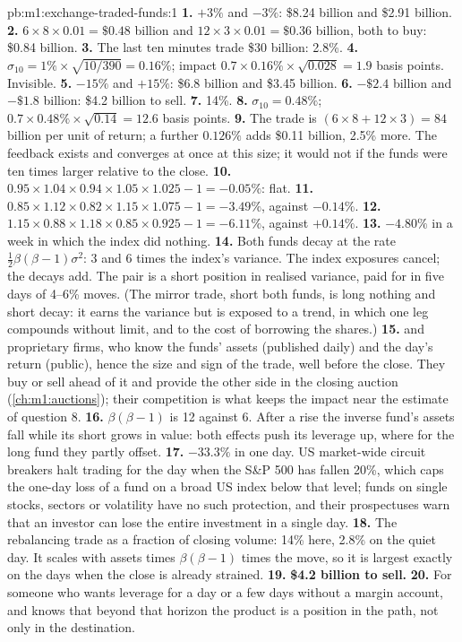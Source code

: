 \begin{solution}{pb:m1:exchange-traded-funds:1}
\textbf{1.} $+3\%$ and $-3\%$: \$8.24 billion and \$2.91 billion.
\textbf{2.} $6 \times 8 \times 0.01 = \$0.48$ billion and $12 \times 3 \times
0.01 = \$0.36$ billion, both to buy: \$0.84 billion.
\textbf{3.} The last ten minutes trade \$30 billion: 2.8\%.
\textbf{4.} $\sigma_{10} = 1\% \times \sqrt{10/390} = 0.16\%$; impact $0.7
\times 0.16\% \times \sqrt{0.028} = 1.9$ basis points. Invisible.
\textbf{5.} $-15\%$ and $+15\%$: \$6.8 billion and \$3.45 billion.
\textbf{6.} $-\$2.4$ billion and $-\$1.8$ billion: \$4.2 billion to sell.
\textbf{7.} 14\%.
\textbf{8.} $\sigma_{10} = 0.48\%$; $0.7 \times 0.48\% \times \sqrt{0.14} =
12.6$ basis points.
\textbf{9.} The trade is $(6 \times 8 + 12 \times 3) = 84$ billion per unit of
return; a further $0.126\%$ adds \$0.11 billion, 2.5\% more. The feedback
exists and converges at once at this size; it would not if the funds were ten
times larger relative to the close.
\textbf{10.} $0.95 \times 1.04 \times 0.94 \times 1.05 \times 1.025 - 1 =
-0.05\%$: flat.
\textbf{11.} $0.85 \times 1.12 \times 0.82 \times 1.15 \times 1.075 - 1 =
-3.49\%$, against $-0.14\%$.
\textbf{12.} $1.15 \times 0.88 \times 1.18 \times 0.85 \times 0.925 - 1 =
-6.11\%$, against $+0.14\%$.
\textbf{13.} $-4.80\%$ in a week in which the index did nothing.
\textbf{14.} Both funds decay at the rate $\tfrac12\beta(\beta-1)\sigma^2$: 3
and 6 times the index's variance. The index exposures cancel; the decays add.
The pair is a short position in realised variance, paid for in five days of
4--6\% moves. (The mirror trade, short both funds, is long nothing and short
decay: it earns the variance but is exposed to a trend, in which one leg
compounds without limit, and to the cost of borrowing the shares.)
\textbf{15.}  and proprietary firms, who know the funds' assets
(published daily) and the day's return (public), hence the size and sign of
the trade, well before the close. They buy or sell ahead of it and provide
the other side in the closing auction (\cref{ch:m1:auctions}); their
competition is what keeps the impact near the estimate of question 8.
\textbf{16.} $\beta(\beta-1)$ is 12 against 6. After a rise the inverse
fund's assets fall while its short grows in value: both effects push its
leverage up, where for the long fund they partly offset.
\textbf{17.} $-33.3\%$ in one day. US market-wide circuit breakers halt
trading for the day when the S\&P 500 has fallen 20\%, which caps the one-day
loss of a fund on a broad US index below that level; funds on single stocks,
sectors or volatility have no such protection, and their prospectuses warn
that an investor can lose the entire investment in a single day.
\textbf{18.} The rebalancing trade as a fraction of closing volume: 14\% here,
2.8\% on the quiet day. It scales with assets times $\beta(\beta-1)$ times the
move, so it is largest exactly on the days when the close is already
strained.
\textbf{19.} \textbf{\$4.2 billion to sell.}
\textbf{20.} For someone who wants leverage for a day or a few days without
a margin account, and knows that beyond that horizon the product is a
position in the path, not only in the destination.
\end{solution}

